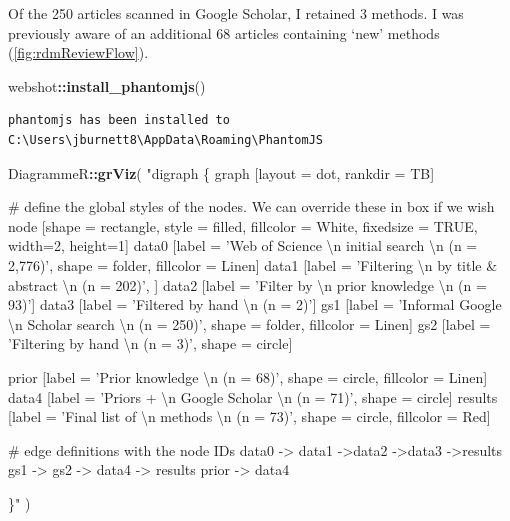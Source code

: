 \documentclass[12pt,twoside,openany]{reedthesis}
\newenvironment{Shaded}{\begin{snugshade}}{\end{snugshade}}
\newcommand{\CharTok}[1]{\textcolor[rgb]{0.31,0.60,0.02}{#1}}
\newcommand{\KeywordTok}[1]{\textcolor[rgb]{0.13,0.29,0.53}{\textbf{#1}}}
\newcommand{\NormalTok}[1]{#1}
\newcommand{\OperatorTok}[1]{\textcolor[rgb]{0.81,0.36,0.00}{\textbf{#1}}}
\newcommand{\StringTok}[1]{\textcolor[rgb]{0.31,0.60,0.02}{#1}}
\begin{document}
Of the 250 articles scanned in Google Scholar, I retained 3 methods. I was previously aware of an additional 68 articles containing `new' methods (\ref{fig:rdmReviewFlow}).
\begin{Shaded}
\begin{Highlighting}[]
\NormalTok{webshot}\OperatorTok{::}\KeywordTok{install_phantomjs}\NormalTok{()}
\end{Highlighting}
\end{Shaded}
\begin{verbatim}
phantomjs has been installed to C:\Users\jburnett8\AppData\Roaming\PhantomJS
\end{verbatim}
\begin{Shaded}
\begin{Highlighting}[]
\NormalTok{DiagrammeR}\OperatorTok{::}\KeywordTok{grViz}\NormalTok{(}
  \StringTok{"digraph \{}
\StringTok{  graph [layout = dot, rankdir = TB]}

\StringTok{  # define the global styles of the nodes. We can override these in box if we wish}
\StringTok{  node [shape = rectangle, style = filled, fillcolor = White, fixedsize = TRUE, width=2, height=1]}
\StringTok{  data0 [label = 'Web of Science }\CharTok{\textbackslash{}n}\StringTok{ initial search }\CharTok{\textbackslash{}n}\StringTok{ (n = 2,776)', shape = folder, fillcolor = Linen]}
\StringTok{  data1 [label = 'Filtering }\CharTok{\textbackslash{}n}\StringTok{ by title & abstract }\CharTok{\textbackslash{}n}\StringTok{ (n = 202)', ]}
\StringTok{  data2 [label = 'Filter by }\CharTok{\textbackslash{}n}\StringTok{ prior knowledge }\CharTok{\textbackslash{}n}\StringTok{ (n = 93)']}
\StringTok{  data3 [label = 'Filtered by hand }\CharTok{\textbackslash{}n}\StringTok{ (n = 2)']}
\StringTok{  }
\StringTok{  gs1 [label = 'Informal Google }\CharTok{\textbackslash{}n}\StringTok{ Scholar search }\CharTok{\textbackslash{}n}\StringTok{ (n = 250)', shape = folder, fillcolor = Linen]}
\StringTok{  gs2 [label = 'Filtering by hand }\CharTok{\textbackslash{}n}\StringTok{ (n = 3)', shape = circle]}

\StringTok{   }
\StringTok{  prior [label = 'Prior knowledge }\CharTok{\textbackslash{}n}\StringTok{ (n = 68)', shape = circle, fillcolor = Linen]}
\StringTok{  data4 [label = 'Priors + }\CharTok{\textbackslash{}n}\StringTok{ Google Scholar }\CharTok{\textbackslash{}n}\StringTok{ (n = 71)', shape = circle]}
\StringTok{  }
\StringTok{  results [label = 'Final list of }\CharTok{\textbackslash{}n}\StringTok{ methods }\CharTok{\textbackslash{}n}\StringTok{ (n = 73)', shape = circle, fillcolor = Red]}

\StringTok{# edge definitions with the node IDs}
\StringTok{data0 -> data1 ->data2 ->data3 ->results}
\StringTok{gs1 -> gs2 -> data4 -> results}
\StringTok{prior -> data4}

\StringTok{\}"}
\NormalTok{  )}
\end{Highlighting}
\end{Shaded}
\end{document}
